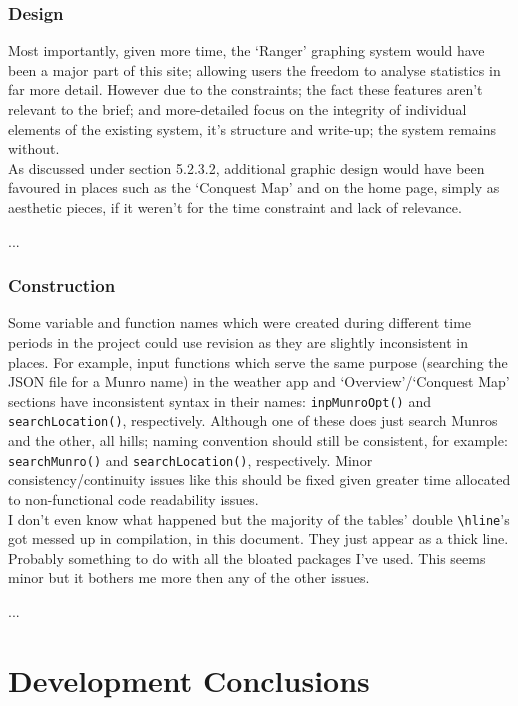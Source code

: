\documentclass[11pt, english]{article}
\begin{document}
		\subsubsection{Design}

	Most importantly, given more time, the `Ranger' graphing system would have been a major part of this site; allowing users the freedom to analyse statistics in far more detail. However due to the constraints; the fact these features aren't relevant to the brief; and more-detailed focus on the integrity of individual elements of the existing system, it's structure and write-up; the system remains without.\\

	As discussed under section 5.2.3.2, additional graphic design would have been favoured in places such as the `Conquest Map' and on the home page, simply as aesthetic pieces, if it weren't for the time constraint and lack of relevance.

	...

		\subsubsection{Construction}

	Some variable and function names which were created during different time periods in the project could use revision as they are slightly inconsistent in places. For example, input functions which serve the same purpose (searching the JSON file for a Munro name) in the weather app and `Overview'/`Conquest Map' sections have inconsistent syntax in their names: \texttt{inpMunroOpt()} and \texttt{searchLocation()}, respectively. Although one of these does just search Munros and the other, all hills; naming convention should still be consistent, for example: \texttt{searchMunro()} and \texttt{searchLocation()}, respectively. Minor consistency/continuity issues like this should be fixed given greater time allocated to non-functional code readability issues.\\

	I don't even know what happened but the majority of the tables' double \verb|\hline|'s got messed up in compilation, in this document. They just appear as a thick line. Probably something to do with all the bloated packages I've used. This seems minor but it bothers me more then any of the other issues.

	...

\newpage

\section{Development Conclusions}\label{ch8}
\end{document}
